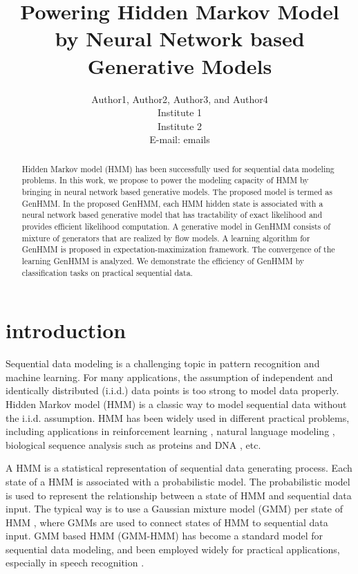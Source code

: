 \documentclass[letterpaper]{article} %
\title{Powering Hidden Markov Model by Neural Network based Generative Models}
\author{
  Author1, Author2, Author3, and Author4\\
  Institute 1\\
  Institute 2 \\
  E-mail: emails}
\begin{document}
\maketitle
\begin{abstract}
Hidden Markov model (HMM) has been successfully used for sequential
data modeling problems.
In this work, we propose to power the modeling capacity of HMM by
bringing in neural network based generative models.
The proposed model is termed as GenHMM.
In the proposed GenHMM, each HMM hidden state is associated with a
neural network based generative model that has
tractability of exact likelihood and provides efficient likelihood
computation.
A generative model in GenHMM consists of mixture of generators
that are realized by flow models.
A learning algorithm for GenHMM is proposed in
expectation-maximization framework.
The convergence of the learning GenHMM is analyzed.
We demonstrate the efficiency of GenHMM by classification tasks on practical sequential data.
\end{abstract}

\section{introduction}
Sequential data modeling is a challenging topic in pattern recognition and machine learning. For many applications, the assumption of independent and identically distributed (i.i.d.) data points is too strong to model data properly. Hidden Markov model (HMM) is a classic way to model sequential data without the i.i.d. assumption. HMM has been widely used in different practical problems, including applications in reinforcement learning \cite{ding2018reinforcementhmm,levine2018reinforcementReview}, natural language modeling \cite{khan2016survey,Hariyanti_2019}, biological sequence analysis such as proteins \cite{ASHWIN20172} and DNA \cite{ren2015dna}, etc.

A HMM is a statistical representation of sequential data generating process.
Each state of a HMM is associated with a probabilistic model.
The probabilistic model is used to represent the relationship between a state of HMM and sequential data input. The typical way is to use a Gaussian mixture model (GMM) per state of HMM \cite{juang1986maximum}, where GMMs are used to connect states of HMM to sequential data input. GMM based HMM (GMM-HMM) has become a standard model for sequential data modeling, and been employed widely for practical applications, especially in speech recognition \cite{gales2008application,chatterjee2011auditory}.
\end{document}
